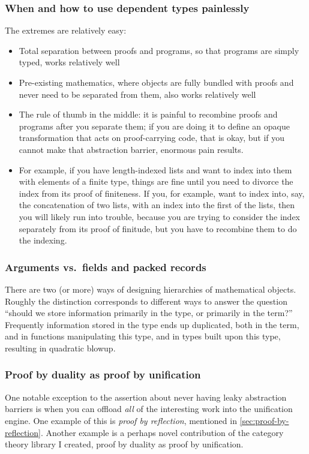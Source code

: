 \documentclass[twoside]{article}
\begin{document}
\subsubsection{When and how to use dependent types painlessly}
The extremes are relatively easy:
\begin{itemize}
\item Total separation between proofs and programs, so that programs are simply typed, works relatively well
\item Pre-existing mathematics, where objects are fully bundled with proofs and never need to be separated from them, also works relatively well
\item The rule of thumb in the middle: it is painful to recombine proofs and programs after you separate them; if you are doing it to define an opaque transformation that acts on proof-carrying code, that is okay, but if you cannot make that abstraction barrier, enormous pain results.
\item For example, if you have length-indexed lists and want to index into them with elements of a finite type, things are fine until you need to divorce the index from its proof of finiteness.  If you, for example, want to index into, say, the concatenation of two lists, with an index into the first of the lists, then you will likely run into trouble, because you are trying to consider the index separately from its proof of finitude, but you have to recombine them to do the indexing.
\end{itemize}

\subsubsection{Arguments vs.~fields and packed records}
There are two (or more) ways of designing hierarchies of mathematical objects.
Roughly the distinction corresponds to different ways to answer the question ``should we store information primarily in the type, or primarily in the term?''
Frequently information stored in the type ends up duplicated, both in the term, and in functions manipulating this type, and in types built upon this type, resulting in quadratic blowup.

\subsubsection{Proof by duality as proof by unification}
One notable exception to the assertion about never having leaky abstraction barriers is when you can offload \emph{all} of the interesting work into the unification engine.
One example of this is \emph{proof by reflection}, mentioned in \autoref{sec:proof-by-reflection}.
Another example is a perhaps novel contribution of the category theory library I created, proof by duality as proof by unification.
\end{document}
